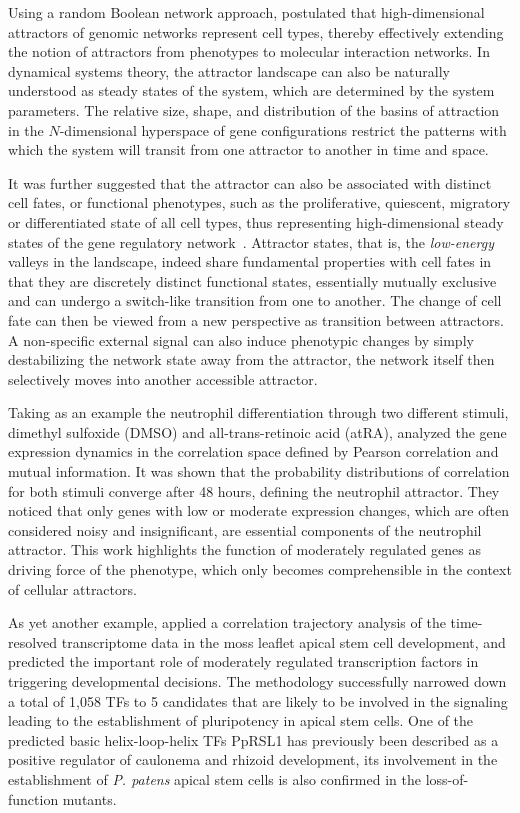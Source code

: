 Using a random Boolean network approach, \cite{Kauffman1969a} postulated that high-dimensional attractors of genomic networks represent cell types, thereby effectively
extending the notion of attractors from phenotypes to molecular interaction
networks.
In dynamical systems theory, the attractor landscape can also be naturally 
understood as steady states of the system, which are determined by the system 
parameters.
The relative size, shape, and distribution of the basins of
attraction in the $N$-dimensional hyperspace of gene configurations restrict the patterns with which the system will
transit from one attractor to another in time and space.

It was further suggested that the attractor can also be associated with distinct cell fates, or functional phenotypes, such as the proliferative, quiescent, migratory or differentiated state of all cell types, thus representing high-dimensional 
steady states of the gene regulatory network~\citep{Huang2006,Huang2005}.
Attractor states, that is, the \emph{low-energy} valleys in the landscape, indeed share fundamental properties with cell fates in that they are discretely distinct functional states, essentially mutually exclusive and can undergo a switch-like transition from one to another. The change of cell fate can then be viewed from a new
perspective as transition between
attractors. A non-specific external signal can also induce phenotypic changes by
simply destabilizing the network state 
away from the attractor, the network itself then selectively moves into another
accessible attractor.

Taking as an example the neutrophil differentiation through two different stimuli, dimethyl sulfoxide (DMSO) and all-trans-retinoic acid (atRA), \cite{Tsuchiya2010}
analyzed the gene expression dynamics in the correlation space defined by Pearson correlation and mutual information. It was shown that the probability distributions of
correlation for both stimuli converge after 48 hours, defining the neutrophil attractor. They noticed that only genes with low or moderate expression changes, which are often considered noisy and insignificant, are essential components of the neutrophil attractor. This work highlights the function of moderately regulated genes as 
driving force of the phenotype, which only becomes comprehensible in the context
of cellular attractors.

As yet another example, \cite{Busch2013} applied a correlation trajectory analysis of the 
time-resolved transcriptome data in the moss leaflet apical stem cell development, 
and predicted the important role of 
moderately regulated transcription factors in triggering developmental 
decisions. The methodology successfully narrowed down a total of 1,058 TFs to 
5 candidates that are likely to be involved in the signaling leading to the establishment of pluripotency in apical stem cells. One of the predicted basic helix-loop-helix TFs PpRSL1 has previously been described as a positive regulator of caulonema and rhizoid development, 
its involvement in the establishment of \emph{P. patens} apical stem cells is also confirmed
in the loss-of-function mutants.

